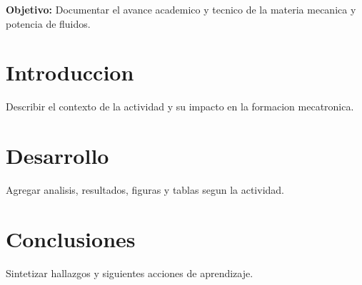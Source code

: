 \documentclass[spanish,letterpaper,oneside]{article}
\begin{document}
\templatePortrait
\templatePagecfg
\onehalfspacing

\begin{abstractd}
\textbf{Objetivo:} Documentar el avance academico y tecnico de la materia mecanica y potencia de fluidos.
\end{abstractd}

\templateIndex
\templateFinalcfg

\section{Introduccion}
Describir el contexto de la actividad y su impacto en la formacion mecatronica.

\section{Desarrollo}
Agregar analisis, resultados, figuras y tablas segun la actividad.

\section{Conclusiones}
Sintetizar hallazgos y siguientes acciones de aprendizaje.



\end{document}
